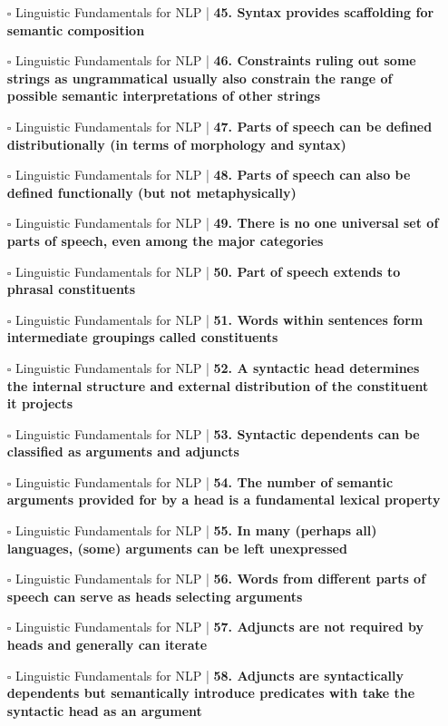 \documentclass[a4, landscape, 12pt]{article}
\newcommand{\checkbox}{$\square$}%
\begin{document}
\begin{itemize}
{}
\item [\checkbox]  Linguistic Fundamentals for NLP | \textbf{ 45. Syntax provides scaffolding for semantic composition
}
\item [\checkbox]  Linguistic Fundamentals for NLP | \textbf{ 46. Constraints ruling out some strings as ungrammatical usually also constrain the range of possible semantic interpretations of other strings
}
\item [\checkbox]  Linguistic Fundamentals for NLP | \textbf{ 47. Parts of speech can be defined distributionally (in terms of morphology and syntax)
}
\item [\checkbox]  Linguistic Fundamentals for NLP | \textbf{ 48. Parts of speech can also be defined functionally (but not metaphysically)
}
\item [\checkbox]  Linguistic Fundamentals for NLP | \textbf{ 49. There is no one universal set of parts of speech, even among the major categories
}
\item [\checkbox]  Linguistic Fundamentals for NLP | \textbf{ 50. Part of speech extends to phrasal constituents
}
\item [\checkbox]  Linguistic Fundamentals for NLP | \textbf{ 51. Words within sentences form intermediate groupings called constituents
}
\item [\checkbox]  Linguistic Fundamentals for NLP | \textbf{ 52. A syntactic head determines the internal structure and external distribution of the constituent it projects
}
\item [\checkbox]  Linguistic Fundamentals for NLP | \textbf{ 53. Syntactic dependents can be classified as arguments and adjuncts
}
\item [\checkbox]  Linguistic Fundamentals for NLP | \textbf{ 54. The number of semantic arguments provided for by a head is a fundamental lexical property
}
\item [\checkbox]  Linguistic Fundamentals for NLP | \textbf{ 55. In many (perhaps all) languages, (some) arguments can be left unexpressed
}
\item [\checkbox]  Linguistic Fundamentals for NLP | \textbf{ 56. Words from different parts of speech can serve as heads selecting arguments
}
\item [\checkbox]  Linguistic Fundamentals for NLP | \textbf{ 57. Adjuncts are not required by heads and generally can iterate
}
\item [\checkbox]  Linguistic Fundamentals for NLP | \textbf{ 58. Adjuncts are syntactically dependents but semantically introduce predicates with take the syntactic head as an argument
}
\end{itemize}
\end{document}
